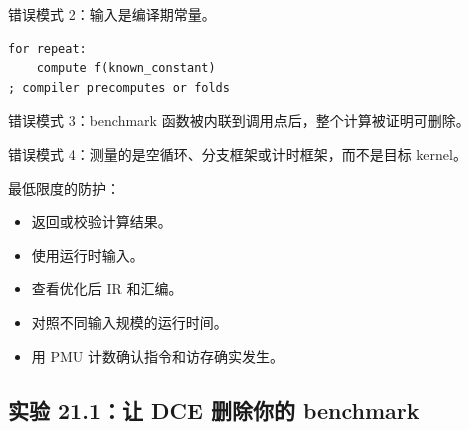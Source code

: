 错误模式 2：输入是编译期常量。

\begin{lstlisting}
for repeat:
    compute f(known_constant)
; compiler precomputes or folds
\end{lstlisting}

错误模式 3：benchmark 函数被内联到调用点后，整个计算被证明可删除。

错误模式 4：测量的是空循环、分支框架或计时框架，而不是目标 kernel。

最低限度的防护：

\begin{itemize}
  \item 返回或校验计算结果。
  \item 使用运行时输入。
  \item 查看优化后 IR 和汇编。
  \item 对照不同输入规模的运行时间。
  \item 用 PMU 计数确认指令和访存确实发生。
\end{itemize}

\subsection{实验 21.1：让 DCE 删除你的 benchmark}

